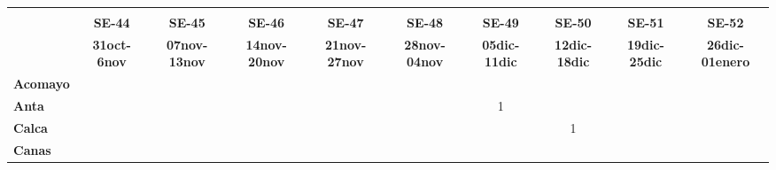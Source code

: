 \begin{tabular}{lccccccccc}
	\textbf{}              & \multicolumn{1}{l}{}                        & \multicolumn{1}{l}{}      & \multicolumn{1}{l}{}                         & \multicolumn{1}{l}{}                         & \multicolumn{1}{l}{}                         & \multicolumn{1}{l}{}                        & \multicolumn{1}{l}{}                         & \multicolumn{1}{l}{}                         & \multicolumn{1}{l}{}     \\
	\textbf{}                                                                               
	&\textbf{SE-44} 
	&\textbf{SE-45} 							&\textbf{SE-46} 
	&\textbf{SE-47}								&\textbf{SE-48}  				  &\textbf{SE-49}
	&\textbf{SE-50}								&\textbf{SE-51}					  &\textbf{SE-52}\\
		\textbf{}              
	&\textbf{31oct-6nov}  						&\textbf{07nov-13nov} 
	&\textbf{14nov-20nov} 						&\textbf{21nov-27nov} 	  		&\textbf{28nov-04nov} 	
	&\textbf{05dic-11dic}						&\textbf{12dic-18dic}			&\textbf{19dic-25dic}
	&\textbf{26dic-01enero}\\
	\textbf{Acomayo}                        	
	&\cellcolor[HTML]{FCC46C}          			&\cellcolor[HTML]{FCC46C}                   &\cellcolor[HTML]{FCC46C}  			        &\cellcolor[HTML]{FCC46C}          			&\cellcolor[HTML]{FCC46C} 					&\cellcolor[HTML]{FCC46C} 	    			&\cellcolor[HTML]{FCC46C}				    &\cellcolor[HTML]{FCC46C}
	&\cellcolor[HTML]{FCC46C}\\
	\textbf{Anta}                                                          		
	&\cellcolor[HTML]{FCC46C} 				    &\cellcolor[HTML]{FCC46C}		  			&\cellcolor[HTML]{FCC46C}					&\cellcolor[HTML]{FCC46C}					&\cellcolor[HTML]{FCC46C} 					
	&1											&\cellcolor[HTML]{FCC46C}					
	&\cellcolor[HTML]{FCC46C}					&\cellcolor[HTML]{FCC46C} \\
	\textbf{Calca}      				       
	&\cellcolor[HTML]{FCC46C}                   &\cellcolor[HTML]{FCC46C}         			&\cellcolor[HTML]{FCC46C}                   &\cellcolor[HTML]{FCC46C}                   &\cellcolor[HTML]{FCC46C}  		            &\cellcolor[HTML]{FCC46C} 					&1 								            
	&\cellcolor[HTML]{FCC46C}	&\cellcolor[HTML]{FCC46C}\\                										
	\textbf{Canas}                              
	&\cellcolor[HTML]{FCC46C}                   &\cellcolor[HTML]{FCC46C} 					&\cellcolor[HTML]{FCC46C}       			&\cellcolor[HTML]{FCC46C} 
	&\cellcolor[HTML]{FCC46C} 					&\cellcolor[HTML]{FCC46C} 		&\cellcolor[HTML]{FCC46C}					&\cellcolor[HTML]{FCC46C} 		

\end{tabular}
